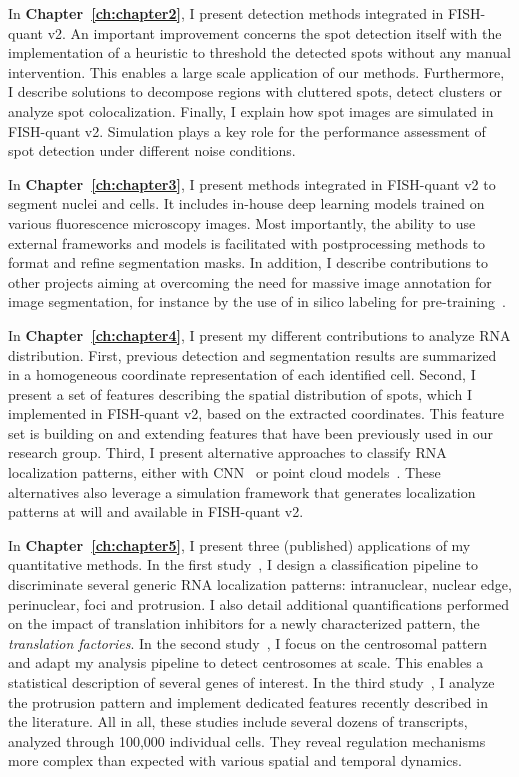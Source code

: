 In \textbf{Chapter~\ref{ch:chapter2}}, I present detection methods integrated in FISH-quant v2.
An important improvement concerns the spot detection itself with the implementation of a heuristic to threshold the detected spots without any manual intervention.
This enables a large scale application of our methods.
Furthermore, I describe solutions to decompose regions with cluttered spots, detect clusters or analyze spot colocalization.
Finally, I explain how spot images are simulated in FISH-quant v2. Simulation plays a key role for the performance assessment of spot detection under different noise conditions.

In \textbf{Chapter~\ref{ch:chapter3}}, I present methods integrated in FISH-quant v2 to segment nuclei and cells.
It includes in-house deep learning models trained on various fluorescence microscopy images.
Most importantly, the ability to use external frameworks and models is facilitated with postprocessing methods to format and refine segmentation masks.
In addition, I describe contributions to other projects aiming at overcoming the need for massive image annotation for image segmentation, for instance by the use of in silico labeling for pre-training~\cite{Bonte_2022}.

In \textbf{Chapter~\ref{ch:chapter4}}, I present my different contributions to analyze \ac{RNA} distribution.
First, previous detection and segmentation results are summarized in a homogeneous coordinate representation of each identified cell.
Second, I present a set of features describing the spatial distribution of spots, which I implemented in FISH-quant v2, based on the extracted coordinates. This feature set is building on and extending features that have been previously used in our research group. 
Third, I present alternative approaches to classify \ac{RNA} localization patterns, either with \ac{CNN}~\cite{dubois_deep_2019} or point cloud models~\cite{pointfish_2022}.
These alternatives also leverage a simulation framework that generates localization patterns at will and available in FISH-quant v2.

In \textbf{Chapter~\ref{ch:chapter5}}, I present three (published) applications of my quantitative methods.
In the first study~\cite{CHOUAIB_2020}, I design a classification pipeline to discriminate several generic \ac{RNA} localization patterns: intranuclear, nuclear edge, perinuclear, foci and protrusion.
I also detail additional quantifications performed on the impact of translation inhibitors for a newly characterized pattern, the \emph{translation factories}.
In the second study~\cite{safieddine_choreography_2021}, I focus on the centrosomal pattern and adapt my analysis pipeline to detect centrosomes at scale.
This enables a statistical description of several genes of interest.
In the third study~\cite{pichon_kinesin_2021}, I analyze the protrusion pattern and implement dedicated features recently described in the literature.
All in all, these studies include several dozens of transcripts, analyzed through 100,000 individual cells.
They reveal regulation mechanisms more complex than expected with various spatial and temporal dynamics.

